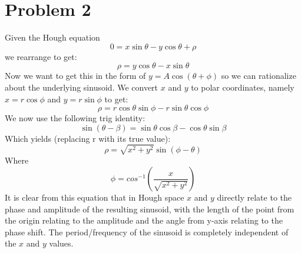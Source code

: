 \documentclass{article}
\begin{document}
\section{Problem 2}
Given the Hough equation 
\[
0 = x\sin{\theta}-y\cos{\theta}+\rho
\]
we rearrange to get:
\[
\rho = y\cos{\theta} - x\sin{\theta}
\]
Now we want to get this in the form of $y=A\cos{(\theta+\phi)}$ so we can rationalize about the underlying sinusoid. We convert $x$ and $y$ to polar coordinates, namely $x=r\cos{\phi}$ and $y=r\sin{\phi}$ to get:
\[
\rho = r \cos{\theta}\sin{\phi}-r\sin{\theta}\cos{\phi}
\]
We now use the following trig identity:
\[
\sin{(\theta-\beta)}=\sin{\theta}\cos{\beta}-\cos{\theta}\sin{\beta}
\]
Which yields (replacing r with its true value):
\[
\rho = \sqrt{x^{2}+y^{2}}
\sin{(\phi-\theta)}
\]
Where
\[
\phi = cos^{-1}{(\frac{x}{\sqrt{x^{2}+y^{2}}})}
\]
It is clear from this equation that in Hough space $x$ and $y$ directly relate to the phase and amplitude of the resulting sinusoid, with the length of the point from the origin relating to the amplitude and the angle from y-axis relating to the phase shift. The period/frequency of the sinusoid is completely independent of the $x$ and $y$ values.
\end{document}
